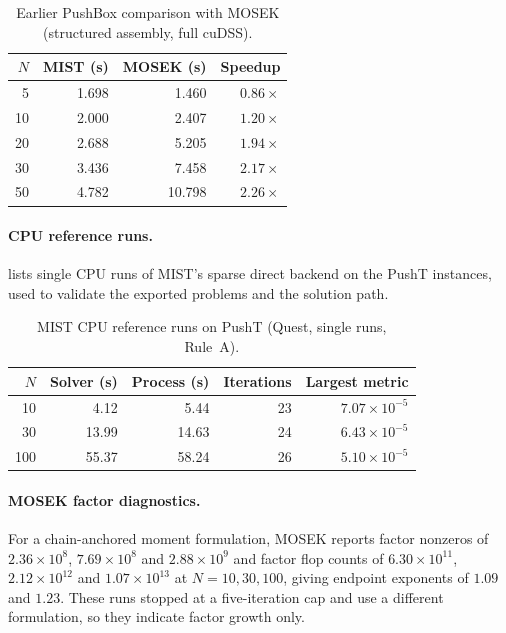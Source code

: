 \begin{table}[htbp]
\centering
\caption{Earlier PushBox comparison with MOSEK (structured assembly, full cuDSS).}
\label{tab:pushbox-old}
\small
\begin{tabular}{@{}rrrr@{}}
\toprule
$N$ & MIST (s) & MOSEK (s) & Speedup\\
\midrule
5 & 1.698 & 1.460 & $0.86\times$\\
10 & 2.000 & 2.407 & $1.20\times$\\
20 & 2.688 & 5.205 & $1.94\times$\\
30 & 3.436 & 7.458 & $2.17\times$\\
50 & 4.782 & 10.798 & $2.26\times$\\
\bottomrule
\end{tabular}
\end{table}

\paragraph{CPU reference runs.}
 lists single CPU runs of MIST's sparse direct backend on the
PushT instances, used to validate the exported problems and the solution path.

\begin{table}[htbp]
\centering
\caption{MIST CPU reference runs on PushT (Quest, single runs, Rule~A).}
\label{tab:quest-cpu}
\small
\begin{tabular}{@{}rrrrr@{}}
\toprule
$N$ & Solver (s) & Process (s) & Iterations & Largest metric\\
\midrule
10 & 4.12 & 5.44 & 23 & $7.07\times10^{-5}$\\
30 & 13.99 & 14.63 & 24 & $6.43\times10^{-5}$\\
100 & 55.37 & 58.24 & 26 & $5.10\times10^{-5}$\\
\bottomrule
\end{tabular}
\end{table}

\paragraph{MOSEK factor diagnostics.}
For a chain-anchored moment formulation, MOSEK reports factor
nonzeros of $2.36\times10^8$, $7.69\times10^8$ and $2.88\times10^9$ and factor
flop counts of $6.30\times10^{11}$, $2.12\times10^{12}$ and $1.07\times10^{13}$ at
$N=10,30,100$, giving endpoint exponents of $1.09$ and $1.23$. These runs stopped
at a five-iteration cap and use a different formulation, so they indicate
factor growth only.
